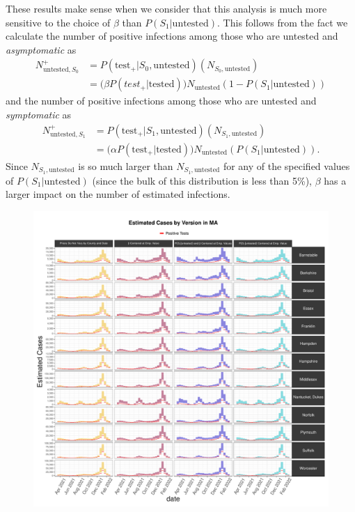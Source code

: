 \documentclass[12pt,twoside]{smiththesis}
\begin{document}
These results make sense when we consider that this analysis is much more sensitive to the choice of \(\beta\) than \(P(S_1|\text{untested})\). This follows from the fact we calculate the number of positive infections among those who are untested and \emph{asymptomatic} as
\begin{align*}
N^+_{\text{untested},S_0} &= P(\text{test}_+| S_0,\text{untested}) (N_{S_0,\text{untested}})\\
&= \Big( \beta P(test_+ |\text{tested}) \Big) N_{\text{untested}} (1-P(S_1|\text{untested}))
\end{align*}
and the number of positive infections among those who are untested and \emph{symptomatic} as\\
\begin{align*} N^+_{\text{untested},S_1}& = P(\text{test}_+| S_1,\text{untested}) (N_{S_1,\text{untested}})\\
&= \Big( \alpha P(\text{test}_+ |\text{tested}) \Big) N_{\text{untested}} (P(S_1|\text{untested})).
\end{align*}
Since \(N_{S_1, \text{untested}}\) is so much larger than \(N_{S_1, \text{untested}}\) for any of the specified values of \(P(S_1|\text{untested})\) (since the bulk of this distribution is less than 5\%), \(\beta\) has a larger impact on the number of estimated infections.
\begin{figure}
\includegraphics[width=0.95\linewidth]{figure/ma_pb_compared_to_observed} \caption{\label{fig:pb_counts_ma}}\label{fig:unnamed-chunk-14}
\end{figure}
\end{document}

